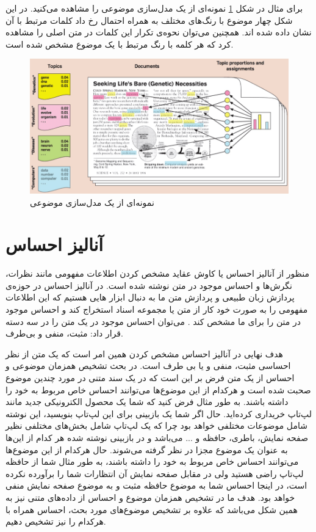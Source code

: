 برای مثال در شکل
\ref{fig2}
نمونه‌ای از یک مدل‌سازی موضوعی را مشاهده می‌‌کنید. در این شکل چهار موضوع با رنگ‌های مختلف به همراه احتمال رخ داد کلمات مرتبط با آن نشان داده شده اند. همچنین می‌‌توان نحوه‌ی تکرار این کلمات در متن اصلی‌ را مشاهده کرد که هر کلمه با رنگ مرتبط با یک موضوع مشخص شده است.
\begin{figure}[!t]
	\centering
	\includegraphics[scale=0.5]{chap2-img/topic_model_example2}
	\caption{نمونه‌ای از یک مدل‌سازی موضوعی}
	\label{fig2}
\end{figure}


\section{آنالیز احساس}
منظور از آنالیز احساس یا کاوش عقاید مشخص کردن اطلاعات مفهومی‌
مانند نظرات، نگرش‌ها و احساس موجود در متن نوشته شده است. در آنالیز احساس در حوزه‌ی ‌‌پردازش زبان طبیعی و پردازش متن ما به دنبال ابزار هایی هستیم که این اطلاعات مفهومی‌ را به صورت خود کار از متن یا مجموعه اسناد استخراج کند و احساس موجود در متن را برای ما مشخص کند
\cite{lin2012weakly}\cite{pang2008opinion}.
 می‌توان احساس موجود در یک متن را در سه‌ دسته قرار داد: مثبت، منفی‌ و بی‌طرف.

هدف نهایی در آنالیز احساس مشخص کردن همین امر است  که یک متن از نظر احساسی‌ مثبت، منفی‌ و یا بی‌ طرف است. در بحث تشخیص همزمان موضوعی و احساس از یک متن فرض بر این است که در یک سند متنی در مورد چندین موضوع صحبت شده است و هرکدام از این موضوع‌ها می‌‌توانند احساس خاص مربوط به خود را داشته باشند. به طور مثال فرض کنید که شما یک محصول الکترونیکی جدید مانند لپ‌تاپ خریداری کرده‌اید. حال اگر شما یک بازبینی
برای این لپ‌تاپ بنویسید، این نوشته شامل موضوعات مختلفی‌ خواهد بود چرا که یک لپ‌تاپ شامل بخش‌های مختلفی‌ نظیر صفحه نمایش، باطری، حافظه و ... می‌‌باشد و در بازبینی نوشته شده هر کدام از این‌ها به عنوان یک موضوع مجزا در نظر گرفته می‌‌شوند. حال هرکدام از این موضوع‌ها می‌‌توانند احساس خاص مربوط به خود را داشته باشند، به طور مثال شما از حافظه لپ‌تاپ راضی‌ هستید ولی‌ در مقابل صفحه نمایش آن انتظارات شما را برآورده نکرده است، در اینجا احساس شما به موضوع حافظه مثبت و به موضوع صفحه نمایش منفی‌ خواهد بود. هدف ما در تشخیص همزمان موضوع و احساس از داده‌های متنی نیز به همین شکل می‌باشد که علاوه بر تشخیص موضوع‌های مورد بحث، احساس همراه با هرکدام را نیز تشخیص دهیم.


